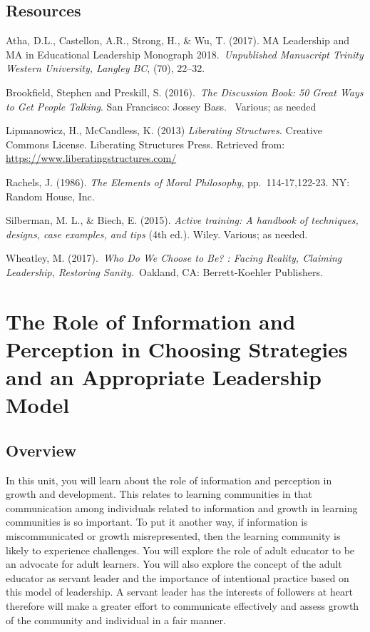 \documentclass[
]{book}
\begin{document}
\hypertarget{resources}{%
\section*{Resources}\label{resources}}

Atha, D.L., Castellon, A.R., Strong, H., \& Wu, T. (2017). MA Leadership and MA in Educational Leadership Monograph 2018.~\emph{Unpublished Manuscript Trinity Western University, Langley BC}, (70), 22--32.

Brookfield, Stephen and Preskill, S. (2016).~\emph{The Discussion Book: 50 Great Ways to Get People Talking}. San Francisco: Jossey Bass. ~Various; as needed

Lipmanowicz, H., McCandless, K. (2013) \emph{Liberating Structures.} Creative Commons License. Liberating Structures Press. Retrieved from: \url{https://www.liberatingstructures.com/}

Rachels, J. (1986). \emph{The Elements of Moral Philosophy}, pp.~114-17,122-23. NY: Random House, Inc.

Silberman, M. L., \& Biech, E. (2015). \emph{Active training: A handbook of techniques, designs, case examples, and tips} (4th ed.). Wiley. Various; as needed.

Wheatley, M. (2017).~\emph{Who Do We Choose to Be? : Facing Reality, Claiming Leadership, Restoring Sanity.}~Oakland, CA: Berrett-Koehler Publishers.

\hypertarget{the-role-of-information-and-perception-in-choosing-strategies-and-an-appropriate-leadership-model}{%
\chapter{The Role of Information and Perception in Choosing Strategies and an Appropriate Leadership Model}\label{the-role-of-information-and-perception-in-choosing-strategies-and-an-appropriate-leadership-model}}

\hypertarget{overview-6}{%
\section*{Overview}\label{overview-6}}

In this unit, you will learn about the role of information and perception in growth and development. This relates to learning communities in that communication among individuals related to information and growth in learning communities is so important. To put it another way, if information is miscommunicated or growth misrepresented, then the learning community is likely to experience challenges. You will explore the role of adult educator to be an advocate for adult learners. You will also explore the concept of the adult educator as servant leader and the importance of intentional practice based on this model of leadership. A servant leader has the interests of followers at heart therefore will make a greater effort to communicate effectively and assess growth of the community and individual in a fair manner.
\end{document}
